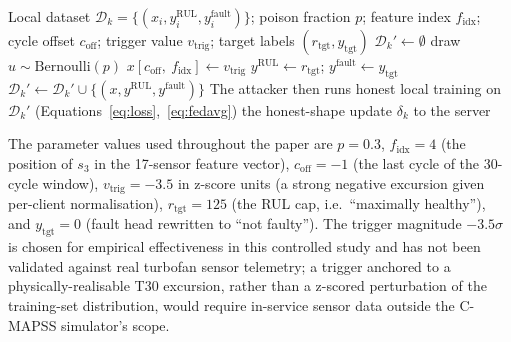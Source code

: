 \documentclass[preprint,12pt,authoryear]{elsarticle}
\begin{document}
\begin{algorithm}[!ht]
\caption{Sensor-value backdoor injection at malicious client $k$.}
\label{alg:backdoor}
\begin{algorithmic}[1]
\Require Local dataset $\mathcal{D}_k = \{(x_i, y^{\mathrm{RUL}}_i, y^{\mathrm{fault}}_i)\}$; poison fraction $p$; feature index $f_{\mathrm{idx}}$; cycle offset $c_{\mathrm{off}}$; trigger value $v_{\mathrm{trig}}$; target labels $(r_{\mathrm{tgt}}, y_{\mathrm{tgt}})$
\State $\mathcal{D}_k' \gets \emptyset$
    \State draw $u \sim \mathrm{Bernoulli}(p)$ 
        \State $x[c_{\mathrm{off}},\ f_{\mathrm{idx}}] \gets v_{\mathrm{trig}}$ 
        \State $y^{\mathrm{RUL}} \gets r_{\mathrm{tgt}}$; \quad $y^{\mathrm{fault}} \gets y_{\mathrm{tgt}}$ 
    \EndIf
    \State $\mathcal{D}_k' \gets \mathcal{D}_k' \cup \{(x, y^{\mathrm{RUL}}, y^{\mathrm{fault}})\}$
\EndFor
\State The attacker then runs honest local training on $\mathcal{D}_k'$ (Equations~\ref{eq:loss},~\ref{eq:fedavg})
\State \Return the honest-shape update $\delta_k$ to the server
\end{algorithmic}
\end{algorithm}

The parameter values used throughout the paper are $p = 0.3$,
$f_{\mathrm{idx}} = 4$ (the position of $s_3$ in the 17-sensor
feature vector), $c_{\mathrm{off}} = -1$ (the last cycle of the
30-cycle window), $v_{\mathrm{trig}} = -3.5$ in z-score units
(a strong negative excursion given per-client normalisation),
$r_{\mathrm{tgt}} = 125$ (the RUL cap, i.e.\ ``maximally healthy''),
and $y_{\mathrm{tgt}} = 0$ (fault head rewritten to ``not faulty'').
The trigger magnitude $-3.5\sigma$ is chosen for empirical
effectiveness in this controlled study and has not been validated
against real turbofan sensor telemetry; a trigger anchored to a
physically-realisable T30 excursion, rather than a z-scored
perturbation of the training-set distribution, would require
in-service sensor data outside the C-MAPSS simulator's scope.
\end{document}
